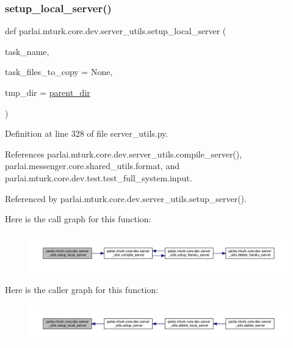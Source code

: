 \subsubsection{\texorpdfstring{setup\+\_\+local\+\_\+server()}{setup\_local\_server()}}
{\footnotesize\ttfamily def parlai.\+mturk.\+core.\+dev.\+server\+\_\+utils.\+setup\+\_\+local\+\_\+server (\begin{DoxyParamCaption}\item[{}]{task\+\_\+name,  }\item[{}]{task\+\_\+files\+\_\+to\+\_\+copy = {\ttfamily None},  }\item[{}]{tmp\+\_\+dir = {\ttfamily \hyperlink{namespaceparlai_1_1mturk_1_1core_1_1dev_1_1server__utils_a432ae14c0d872fbfebe4d9b7d73d13b9}{parent\+\_\+dir}} }\end{DoxyParamCaption})}



Definition at line 328 of file server\+\_\+utils.\+py.



References parlai.\+mturk.\+core.\+dev.\+server\+\_\+utils.\+compile\+\_\+server(), parlai.\+messenger.\+core.\+shared\+\_\+utils.\+format, and parlai.\+mturk.\+core.\+dev.\+test.\+test\+\_\+full\+\_\+system.\+input.



Referenced by parlai.\+mturk.\+core.\+dev.\+server\+\_\+utils.\+setup\+\_\+server().

Here is the call graph for this function\+:
\nopagebreak
\begin{figure}[H]
\begin{center}
\leavevmode
\includegraphics[width=350pt]{namespaceparlai_1_1mturk_1_1core_1_1dev_1_1server__utils_a914cced79fceeef08836d69d91e2d683_cgraph}
\end{center}
\end{figure}
Here is the caller graph for this function\+:
\nopagebreak
\begin{figure}[H]
\begin{center}
\leavevmode
\includegraphics[width=350pt]{namespaceparlai_1_1mturk_1_1core_1_1dev_1_1server__utils_a914cced79fceeef08836d69d91e2d683_icgraph}
\end{center}
\end{figure}
\mbox{\label{namespaceparlai_1_1mturk_1_1core_1_1dev_1_1server__utils_a13d7101c43eceb479444919d4e5f49fe}} 
